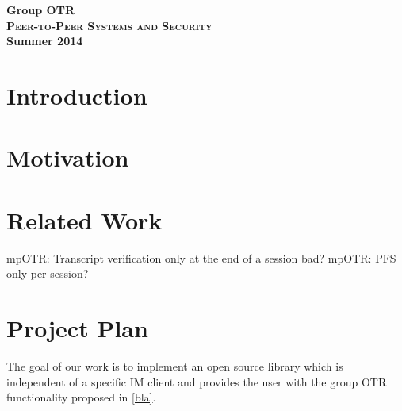 

\title{}
\author{Markus Teich, Jannik Theiß}
\date{\today}



\begin{titlepage}
    \begin{center}
    \huge \textbf{Group OTR} \\
    \vspace{2cm}
    \LARGE\textbf{\textsc{Peer-to-Peer Systems and Security}}\\
    \vspace{0.5cm}
    \textbf{Summer 2014}
    \vspace{3.5cm}
	\end{center}
\end{titlepage}

\section{Introduction}

\section{Motivation}

\section{Related Work}

mpOTR: Transcript verification only at the end of a session bad?
mpOTR: PFS only per session?

\section{Project Plan}

The goal of our work is to implement an open source library which is independent
of a specific IM client and provides the user with the group OTR functionality
proposed in \ref{bla}.


